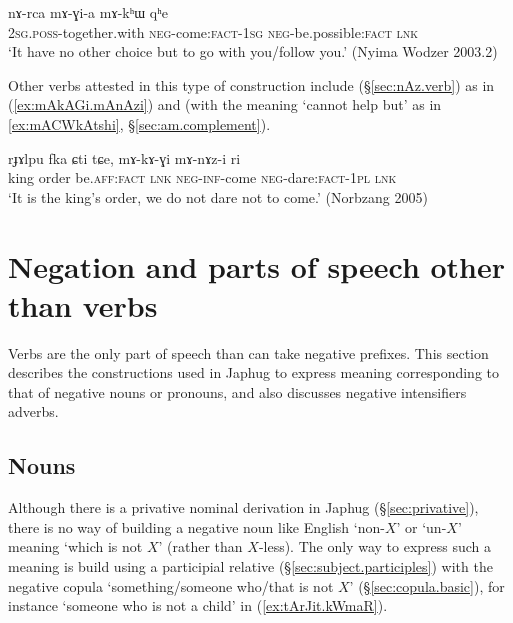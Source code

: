 \begin{exe}
	\ex \label{ex:mAGia.mAkhW}
	\gll  nɤ-rca mɤ-ɣi-a mɤ-kʰɯ qʰe \\
	\textsc{2sg}.\textsc{poss}-together.with \textsc{neg}-come:\textsc{fact}-\textsc{1sg} \textsc{neg}-be.possible:\textsc{fact} \textsc{lnk} \\
	\glt `It have no other choice but to go with you/follow you.' (Nyima Wodzer 2003.2)
\end{exe}

Other verbs attested in this type of construction include  (§\ref{sec:nAz.verb}) as in (\ref{ex:mAkAGi.mAnAzi}) and  (with the meaning `cannot help but' as in \ref{ex:mACWkAtshi}, §\ref{sec:am.complement}).

\begin{exe}
	\ex \label{ex:mAkAGi.mAnAzi}
	\gll rɟɤlpu fka ɕti tɕe, mɤ-kɤ-ɣi mɤ-nɤz-i ri \\
	king order be.\textsc{aff}:\textsc{fact} \textsc{lnk} \textsc{neg}-\textsc{inf}-come \textsc{neg}-dare:\textsc{fact}-\textsc{1pl} \textsc{lnk} \\
	\glt `It is the king's order, we do not dare not to come.' (Norbzang 2005)
\end{exe}


\section{Negation and parts of speech other than verbs} 
Verbs are the only part of speech than can take negative prefixes. This section describes the constructions used in Japhug to express meaning corresponding to that of negative nouns or pronouns, and also discusses negative intensifiers adverbs.

\subsection{Nouns} \label{sec:negation.noun}
Although there is a privative nominal derivation in Japhug (§\ref{sec:privative}), there is no way of building a negative noun like English `non-$X$' or  `un-$X$' meaning `which is not $X$' (rather than $X$-less). The only way to express such a meaning is build using a participial relative (§\ref{sec:subject.participles}) with the negative copula  `something/someone who/that is not $X$' (§\ref{sec:copula.basic}), for instance  `someone who is not a child' in (\ref{ex:tArJit.kWmaR}).

